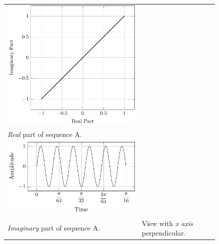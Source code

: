 \documentclass[../../course]{subfiles}
\begin{document}
\begin{figure} [H]
\begin{NiceTabularX} {\textwidth} {
            *{2}{>{\centering\arraybackslash}X}
        }
         {
             {
                \includegraphics[height = \textheight] {tikzpics/plotFrontViewComplexA.pdf}
            }
        }

        \\

         {\emph{Real} part of sequence A.}
        \label{plt:realCmplxA}

        &
        \\

         {
             {
                \includegraphics[height = \textheight] {tikzpics/plotShortX1.pdf}
            }
        }

        &
        \\

         {\emph{Imaginary} part of sequence A.}
        \label{plt:imagCmplxA}

        &

         {View with \emph{x axis} perpendicular.}
        \label{plt:someLabel}

        \\

    \end{NiceTabularX}

\end{figure}
\end{document}

